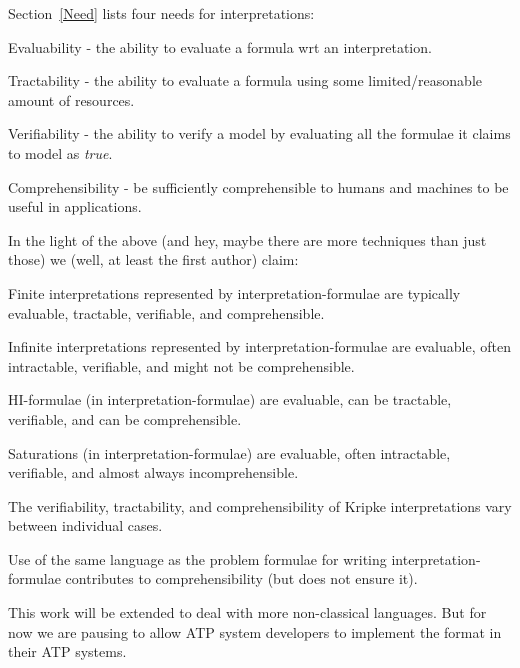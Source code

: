 \documentclass{ceurart}
\newenvironment{packed_itemize}{
\vspace*{-0.3em}
\begin{itemize}
\setlength{\partopsep}{0pt}
\setlength{\itemsep}{1pt}
\setlength{\parskip}{0pt}
\setlength{\parsep}{0pt}
}{\end{itemize}}
\newenvironment{packed_enumerate}{
\vspace*{-0.3em}
\begin{enumerate}
\setlength{\partopsep}{0pt}
\setlength{\itemsep}{1pt}
\setlength{\parskip}{0pt}
\setlength{\parsep}{0pt}
}{\end{enumerate}}
\begin{document}
Section~\ref{Need} lists four needs for interpretations: 
\begin{packed_enumerate}
\item Evaluability - the ability to evaluate a formula wrt an interpretation.
\item Tractability - the ability to evaluate a formula using some limited/reasonable amount of
      resources.
\item Verifiability - the ability to verify a model by evaluating all the formulae it claims
      to model as \textit{true}.
\item Comprehensibility - be sufficiently comprehensible to humans and machines to be useful in 
      applications.
\end{packed_enumerate}

In the light of the above (and hey, maybe there are more techniques than just those) we (well,
at least the first author) claim:
\begin{packed_itemize}
\item Finite interpretations represented by interpretation-formulae are typically evaluable,
      tractable, verifiable, and comprehensible.
\item Infinite interpretations represented by interpretation-formulae are evaluable, often 
      intractable, verifiable, and might not be comprehensible.
\item HI-formulae (in interpretation-formulae) are evaluable, can be tractable, verifiable, 
      and can be comprehensible.
\item Saturations (in interpretation-formulae) are evaluable, often intractable, verifiable, 
      and almost always incomprehensible.
\item The verifiability, tractability, and comprehensibility of Kripke interpretations vary
      between individual cases.
\item Use of the same language as the problem formulae for writing interpretation-formulae
      contributes to comprehensibility (but does not ensure it).
\end{packed_itemize}

This work will be extended to deal with more non-classical languages.
But for now we are pausing to allow ATP system developers to implement the format in their 
ATP systems.
\end{document}
